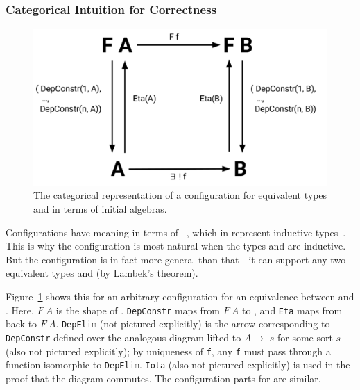 \subsubsection{Categorical Intuition for Correctness}
\label{sec:algebra}

\begin{figure}
\begin{center}
\includegraphics[scale=0.40]{often/Diagram}
\end{center}
\caption{The categorical representation of a configuration for equivalent types \Aa and \B in terms of initial algebras.}
\label{fig:lambek}
\end{figure}

Configurations have meaning in terms of ~\cite{nlab:initial_algebra_of_an_endofunctor},
which in  represent inductive types~\cite{univalent2013homotopy}.
This is why the configuration is most natural when the types \Aa and \B are inductive.
But the configuration is in fact more general than that---it can support any two equivalent types \Aa and \B (by Lambek's theorem).

Figure~\ref{fig:lambek} shows this for an arbitrary configuration for an equivalence between \Aa and \B.
Here, $F\ A$ is the shape of \Aa.
\lstinline{DepConstr} maps from $F\ A$ to \Aa, and \lstinline{Eta} maps from \Aa back to $F\ A$.
\lstinline{DepElim} (not pictured explicitly) is the arrow corresponding to \lstinline{DepConstr} defined over the analogous diagram
lifted to $A \rightarrow$ $s$ for some sort $s$ (also not pictured explicitly);
by uniqueness of \lstinline{f}, any \lstinline{f} must pass through a function 
isomorphic to \lstinline{DepElim}.
\lstinline{Iota} (also not pictured explicitly) is used in the proof that the diagram commutes.
The configuration parts for \B are similar.

